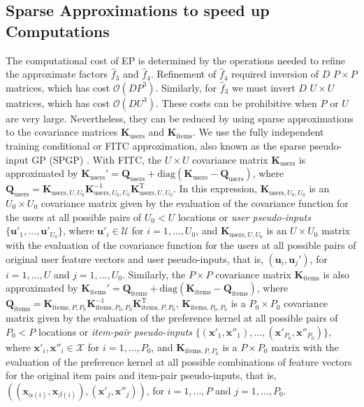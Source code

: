 \subsection{Sparse Approximations to speed up Computations} \label{sec:sparse}

The computational cost of EP is determined by the operations needed to refine the approximate factors $\hat{f}_3$ and $\hat{f}_4$.
Refinement of $\hat{f}_4$ required inversion of $D$ $P\times P$ matrices, which has cost $\mathcal{O}(DP^3)$. Similarly, for $\hat{f}_3$ we must invert $D$ $U\times U$ matrices, which has cost $\mathcal{O}(DU^3)$.
These costs can be prohibitive when $P$ or $U$ are very large.
Nevertheless, they can be reduced by using sparse approximations to the covariance matrices $\mathbf{K}_\text{users}$
and $\mathbf{K}_\text{items}$. We use the fully independent training conditional or FITC
approximation, also known as the sparse pseudo-input GP (SPGP) \cite{snelson2006}.
With FITC, the $U \times U$ covariance matrix $\mathbf{K}_\text{users}$ is approximated by
$\mathbf{K}_\text{users}' = \mathbf{Q}_\text{users} + \text{diag}(\mathbf{K}_\text{users}-\mathbf{Q}_\text{users})$,
where $\mathbf{Q}_\text{users} = \mathbf{K}_{\text{users},U,U_0} \mathbf{K}_{\text{users},U_0,U_0}^{-1} \mathbf{K}_{\text{users},U,U_0}^\text{T}$.
In this expression, $\mathbf{K}_{\text{users},U_0,U_0}$ is an $U_0 \times U_0$ covariance matrix given by the evaluation
of the covariance function for the users at all possible pairs of $U_0 < U$ locations
or \emph{user pseudo-inputs} $\{\mathbf{u}'_1,\ldots,\mathbf{u}'_{U_0}\}$,
where $\mathbf{u}'_i \in \mathcal{U}$ for $i = 1,\ldots,U_0$, and
$\mathbf{K}_{\text{users},U,U_0}$ is an $U \times U_0$ matrix with the evaluation of
the covariance function for the users at all possible pairs of original user feature vectors and user pseudo-inputs,
that is, $(\mathbf{u}_i, \mathbf{u}_j')$, for $i = 1,\ldots,U$ and $j = 1,\ldots,U_0$.
Similarly, the $P \times P$ covariance matrix $\mathbf{K}_\text{items}$ is also approximated by
$\mathbf{K}_\text{items}' = \mathbf{Q}_\text{items} + \text{diag}(\mathbf{K}_\text{items}-\mathbf{Q}_\text{items})$,
where $\mathbf{Q}_\text{items} = \mathbf{K}_{\text{items},P,P_0} \mathbf{K}_{\text{items},P_0,P_0}^{-1} \mathbf{K}_{\text{items},P,P_0}^\text{T}$,
$\mathbf{K}_{\text{items},P_0,P_0}$ is a $P_0 \times P_0$ covariance matrix given by the evaluation
of the preference kernel at all possible pairs of $P_0 < P$ locations or
\emph{item-pair pseudo-inputs} $\{(\mathbf{x}'_1,\mathbf{x}''_1),\ldots,(\mathbf{x}'_{P_0},\mathbf{x}''_{P_0})\}$,
where $\mathbf{x}'_i,\mathbf{x}''_i \in \mathcal{X}$ for $i = 1,\ldots,P_0$,
and $\mathbf{K}_{\text{items},P,P_0}$ is a $P \times P_0$ matrix with the evaluation of
the preference kernel at all possible combinations of feature vectors for the original item pairs and item-pair pseudo-inputs,
that is, $((\mathbf{x}_{\alpha(i)},\mathbf{x}_{\beta(i)}), (\mathbf{x}'_j,\mathbf{x}''_j))$, for $i = 1,\ldots,P$ and $j = 1,\ldots,P_0$.

